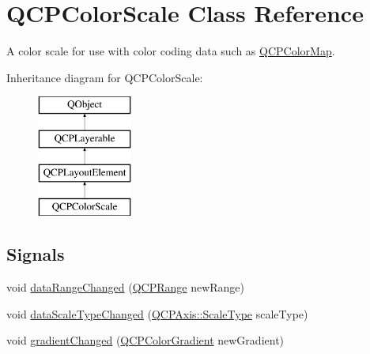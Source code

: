 \hypertarget{class_q_c_p_color_scale}{}\section{Q\+C\+P\+Color\+Scale Class Reference}
\label{class_q_c_p_color_scale}


A color scale for use with color coding data such as \mbox{\hyperlink{class_q_c_p_color_map}{Q\+C\+P\+Color\+Map}}.  


Inheritance diagram for Q\+C\+P\+Color\+Scale\+:\begin{figure}[H]
\begin{center}
\leavevmode
\includegraphics[height=4.000000cm]{class_q_c_p_color_scale}
\end{center}
\end{figure}
\subsection*{Signals}
\begin{DoxyCompactItemize}
\item 
void \mbox{\hyperlink{class_q_c_p_color_scale_a293176da9447ec6819be1d901966a257}{data\+Range\+Changed}} (\mbox{\hyperlink{class_q_c_p_range}{Q\+C\+P\+Range}} new\+Range)
\item 
void \mbox{\hyperlink{class_q_c_p_color_scale_a61558b962f7791ff2f15a565dcf60181}{data\+Scale\+Type\+Changed}} (\mbox{\hyperlink{class_q_c_p_axis_a36d8e8658dbaa179bf2aeb973db2d6f0}{Q\+C\+P\+Axis\+::\+Scale\+Type}} scale\+Type)
\item 
void \mbox{\hyperlink{class_q_c_p_color_scale_a67a5eb06cf551d322885e8635a46378c}{gradient\+Changed}} (\mbox{\hyperlink{class_q_c_p_color_gradient}{Q\+C\+P\+Color\+Gradient}} new\+Gradient)
\end{DoxyCompactItemize}
